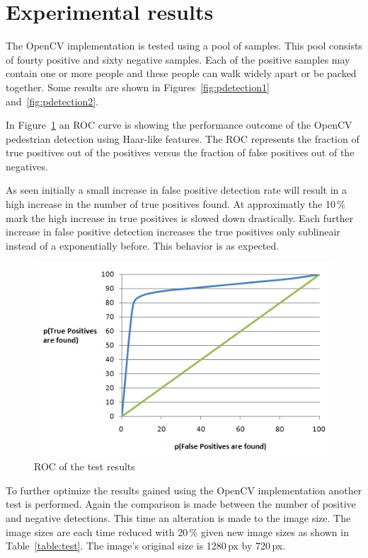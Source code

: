 \documentclass{article}
\begin{document}
\section{Experimental results}
The OpenCV implementation is tested using a pool of samples. This pool consists of fourty positive and sixty negative samples. Each of the positive samples may contain one or more people and these people can walk widely apart or be packed together. Some results are shown in Figures~\ref{fig:pdetection1} and~\ref{fig:pdetection2}.
\par
In Figure~\ref{fig:roc} an ROC curve is showing the performance outcome of the OpenCV pedestrian detection using Haar-like features. The ROC represents the fraction of true positives out of the positives versus the fraction of false positives out of the negatives.
\par
As seen initially a small increase in false positive detection rate will result in a high increase in the number of true positives found. At approximatly the 10\,\% mark the high increase in true positives is slowed down drastically. Each further increase in false positive detection increases the true positives only sublineair instead of a exponentially before. This behavior is as expected.
\begin{figure}[h!]
	\centering
	\includegraphics[scale=0.68]{roc.png}
	\caption{ROC of the test results}
	\label{fig:roc}
\end{figure}
\par
To further optimize the results gained using the OpenCV implementation another test is performed. Again the comparison is made between the number of positive and negative detections. This time an alteration is made to the image size. The image sizes are each time reduced with 20\,\% given new image sizes as shown in Table~\ref{table:test}. The image's original size is 1280\,px by 720\,px.
\end{document}
